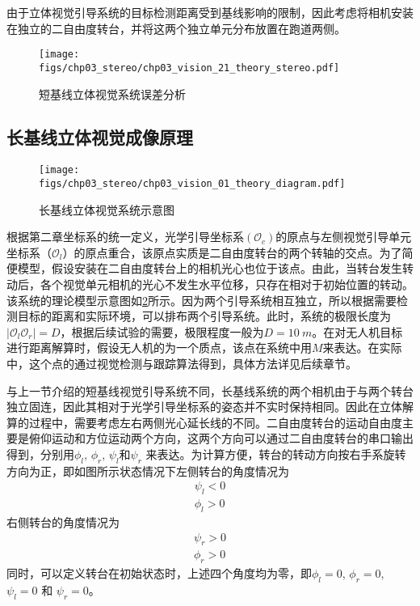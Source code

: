 由于立体视觉引导系统的目标检测距离受到基线影响的限制，因此考虑将相机安装在独立的二自由度转台，并将这两个独立单元分布放置在跑道两侧。

\begin{figure}[!tb]
	\centering
	\texttt{[image: figs/chp03\_stereo/chp03\_vision\_21\_theory\_stereo.pdf]}	
	\caption{短基线立体视觉系统误差分析}
	\label{fig:chp03_vision_21_theory_stereo}
\end{figure}


\subsection{长基线立体视觉成像原理}
\begin{figure}[!tb]
	\centering
	\texttt{[image: figs/chp03\_stereo/chp03\_vision\_01\_theory\_diagram.pdf]}	
	\caption{长基线立体视觉系统示意图}
	\label{fig:chp03_vision_01_theory_diagram}
\end{figure}

根据第二章坐标系的统一定义，光学引导坐标系$(\mathcal{O}_c)$的原点与左侧视觉引导单元坐标系（$\mathcal{O}_l$）的原点重合，该原点实质是二自由度转台的两个转轴的交点。为了简便模型，假设安装在二自由度转台上的相机光心也位于该点。由此，当转台发生转动后，各个视觉单元相机的光心不发生水平位移，只存在相对于初始位置的转动。该系统的理论模型示意图如\ref{fig:chp03_vision_01_theory_diagram}所示。因为两个引导系统相互独立，所以根据需要检测目标的距离和实际环境，可以排布两个引导系统。此时，系统的极限长度为$|\mathcal{O}_l\mathcal{O}_r| = D$，根据后续试验的需要，极限程度一般为$D = 10\ m$。在对无人机目标进行距离解算时，假设无人机的为一个质点，该点在系统中用$M$来表达。在实际中，这个点的通过视觉检测与跟踪算法得到，具体方法详见后续章节。

与上一节介绍的短基线视觉引导系统不同，长基线系统的两个相机由于与两个转台独立固连，因此其相对于光学引导坐标系的姿态并不实时保持相同。因此在立体解算的过程中，需要考虑左右两侧光心延长线的不同。二自由度转台的运动自由度主要是俯仰运动和方位运动两个方向，这两个方向可以通过二自由度转台的串口输出得到，分别用${\phi_l}$, ${\phi_r}$, ${\psi_l}$和${\psi_r}$ 来表达。为计算方便，转台的转动方向按右手系旋转方向为正，即如图所示状态情况下左侧转台的角度情况为
\begin{align}
\psi_l < 0 \\
\phi_l > 0
\end{align}
右侧转台的角度情况为
\begin{align}
\psi_r > 0 \\
\phi_r > 0
\end{align}
同时，可以定义转台在初始状态时，上述四个角度均为零，即$\phi_l= 0$, $\phi_r=0$, ${\psi_l=0}$ 和 ${\psi_r=0}$。



